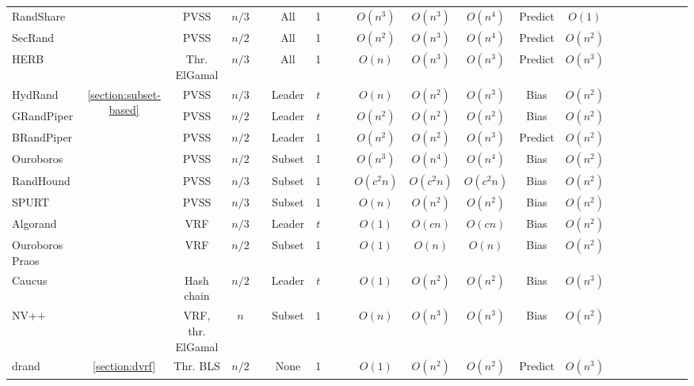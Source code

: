 \documentclass[letterpaper,twocolumn,10pt]{article}
\newcommand{\cmark}{\ding{51}}
\newcommand{\xmark}{\ding{55}}
\theoremstyle{definition}
\theoremstyle{remark}
\begin{document}
\begin{table*}[pt]
\begin{threeparttable}
\begin{tabularx}{\textwidth}{@{} l *{20}c}
RandShare &  & PVSS & $n/3$   & \xmark   & All   & 1   & \cmark    & \cmark   & $O(n^3)$  & $O(n^3)$   & $O(n^4)$  & Predict & $O(1)$ \\ 
SecRand &  & PVSS &  $n/2$  & \xmark   & All   & 1   & \cmark    & \cmark   & $O(n^2)$  & $O(n^3)$   & $O(n^4)$  & Predict & $O(n^2)$ \\ 
HERB &  & Thr. ElGamal & $n/3$   & \xmark   & All   & 1   & \cmark    & \cmark   & $O(n)$  & $O(n^3)$   & $O(n^3)$  & Predict & $O(n^3)$ \\ 
\midrule
HydRand & \multirow{10}{*}{\ref{section:subset-based}} & PVSS & $n/3$   & \xmark   & Leader   & $t$   & \cmark    & \xmark   & $O(n)$  & $O(n^2)$   & $O(n^3)$  & Bias & $O(n^2)$ \\ 
GRandPiper &  & PVSS  & $n/2$   & \xmark   & Leader   & $t$   & \cmark    & \xmark   & $O(n^2)$  & $O(n^2)$   & $O(n^2)$  & Bias & $O(n^2)$ \\ 
BRandPiper &  & PVSS  & $n/2$   & \xmark   & Leader   & 1   & \cmark    & \cmark   & $O(n^2)$  & $O(n^2)$   & $O(n^3)$  & Predict & $O(n^2)$ \\ 
Ouroboros &  & PVSS & $n/2$   & \xmark   & Subset   & 1   & \cmark    & \xmark   & $O(n^3)$  & $O(n^4)$   & $O(n^4)$  & Bias & $O(n^2)$ \\ 
RandHound &  & PVSS & $n/3$   & \xmark   & Subset   & 1   & \xmark    & \xmark   & $O(c^2 n)$  & $O(c^2n)$   & $O(c^2n)$  & Bias & $O(n^2)$ \\ 
SPURT &  & PVSS  & $n/3$   & \xmark   & Subset   & 1   & \cmark    & \cmark   & $O(n)$  & $O(n^2)$   & $O(n^2)$  & Bias & $O(n^2)$ \\ 
Algorand &  & VRF  & $n/3$   & \cmark    & Leader   & $t$   & \xmark    & \cmark   & $O(1)$  & $O(cn)$   & $O(cn)$  & Bias & $O(n^2)$ \\ 
Ouroboros Praos &  & VRF & $n/2$   & \cmark    & Subset   & 1   & \xmark    & \cmark   & $O(1)$  & $O(n)$   & $O(n)$  & Bias & $O(n^2)$ \\ 
Caucus &  & Hash chain &  $n/2$  & \cmark    & Leader   & $t$   & \xmark    & \cmark   & $O(1)$  & $O(n^2)$   & $O(n^2)$  & Bias & $O(n^3)$ \\ 
NV++ &  & VRF, thr. ElGamal &  $n$  & \xmark   & Subset   & $1$   & \xmark    & \cmark   & $O(n)$  & $O(n^3)$   & $O(n^3)$  & Bias & $O(n^2)$ \\ 
\midrule
drand & \multirow{4}{*}{\ref{section:dvrf}} & Thr. BLS & $n/2$   & \xmark   & None   & 1   & \cmark    & \cmark   & $O(1)$  & $O(n^2)$   & $O(n^2)$  & Predict & $O(n^3)$ \\ 

\end{tabularx}
\end{threeparttable}
\end{table*}
\end{document}
